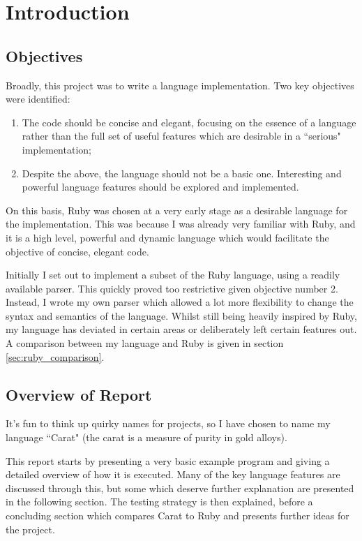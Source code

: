 \section{Introduction}

\subsection{Objectives}

Broadly, this project was to write a language implementation. Two key objectives were identified:

\begin{enumerate}
  \item The code should be concise and elegant, focusing on the essence of a language rather than the full set of useful features which are desirable in a ``serious" implementation;
  \item Despite the above, the language should not be a basic one. Interesting and powerful language features should be explored and implemented.
\end{enumerate}

On this basis, Ruby was chosen at a very early stage as a desirable language for the implementation. This was because I was already very familiar with Ruby, and it is a high level, powerful and dynamic language which would facilitate the objective of concise, elegant code.

Initially I set out to implement a subset of the Ruby language, using a readily available parser. This quickly proved too restrictive given objective number 2. Instead, I wrote my own parser which allowed a lot more flexibility to change the syntax and semantics of the language. Whilst still being heavily inspired by Ruby, my language has deviated in certain areas or deliberately left certain features out. A comparison between my language and Ruby is given in section \ref{sec:ruby_comparison}.

\subsection{Overview of Report}

It's fun to think up quirky names for projects, so I have chosen to name my language ``Carat" (the carat is a measure of purity in gold alloys).

This report starts by presenting a very basic example program and giving a detailed overview of how it is executed. Many of the key language features are discussed through this, but some which deserve further explanation are presented in the following section. The testing strategy is then explained, before a concluding section which compares Carat to Ruby and presents further ideas for the project.

